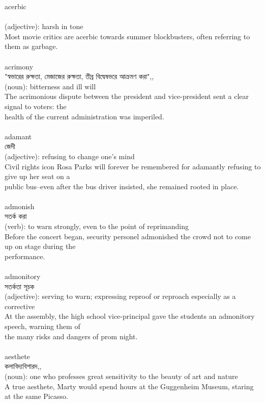 \documentclass{article}
\begin{document}
{acerbic}\\
{}\\
{(adjective): harsh in tone\\Most movie critics are acerbic towards summer blockbusters, often referring to them as garbage.\\}\\
{acrimony}\\
{"স্বভারের রুক্ষতা, মেজাজের রুক্ষতা, তীব্র বিদ্বেষভরে আক্রমণ করা",,}\\
{(noun): bitterness and ill will\\The acrimonious dispute between the president and vice-president sent a clear signal to voters: the\\health of the current administration was imperiled.\\}\\
{adamant}\\
{জেদী}\\
{(adjective): refusing to change one's mind\\Civil rights icon Rosa Parks will forever be remembered for adamantly refusing to give up her seat on a\\public bus--even after the bus driver insisted, she remained rooted in place.\\}\\
{admonish}\\
{সতর্ক করা}\\
{(verb): to warn strongly, even to the point of reprimanding\\Before the concert began, security personel admonished the crowd not to come up on stage during the\\performance.\\}\\
{admonitory}\\
{সতর্কতা সূচক}\\
{(adjective): serving to warn; expressing reproof or reproach especially as a corrective\\At the assembly, the high school vice-principal gave the students an admonitory speech, warning them of\\the many risks and dangers of prom night.\\}\\
{aesthete}\\
{কলাবিদ্যবিশারদ,,}\\
{(noun): one who professes great sensitivity to the beauty of art and nature\\A true aesthete, Marty would spend hours at the Guggenheim Museum, staring at the same Picasso.\\\\                                                                                \\}\\
\end{document}
